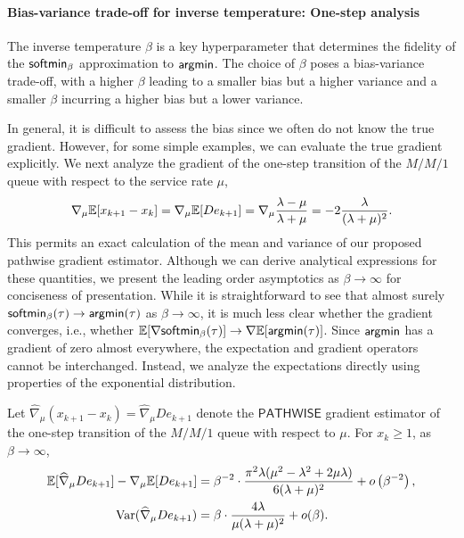 \paragraph{Bias-variance trade-off for inverse temperature: One-step analysis}
The inverse temperature $\beta$ is a key hyperparameter that determines the fidelity of the $\mathsf{softmin}_{\beta}$ approximation to $\mathop{\mathsf{argmin}}$. The choice of $\beta$ poses a bias-variance trade-off, with a higher $\beta$ leading to a smaller bias but a higher variance and a smaller $\beta$ incurring a higher bias but a lower variance. 

In general, it is difficult to assess the bias since we  often do not know the true gradient. However, for some simple examples, we can evaluate the true gradient explicitly. We next analyze the gradient of the one-step transition of the $M/M/1$ queue with respect to the service rate $\mu$,
\[
\nabla_{\mu}\mathbb{E}[x_{k+1} - x_{k}]=  \nabla_{\mu} \mathbb{E}[D e_{k+1}] =\nabla_{\mu}\frac{\lambda - \mu}{\lambda + \mu} = -2\frac{\lambda}{(\lambda + \mu)^{2}}.
\]
This permits an exact calculation of the mean and variance of our proposed pathwise gradient estimator. Although we can derive analytical expressions for these quantities, we present the leading order asymptotics as $\beta \to \infty$ for conciseness of presentation. While it is straightforward to see that almost surely $\mathsf{softmin}_{\beta}(\tau)\to \mathop{\mathsf{argmin}}(\tau)$ as $\beta \to \infty$, it is much less clear whether the gradient converges, i.e., whether $\mathbb{E}[\nabla \mathsf{softmin}_{\beta}(\tau)] \to \nabla \mathbb{E}[\mathop{\mathsf{argmin}}(\tau)]$. Since $\mathop{\mathsf{argmin}}$ has a gradient of zero almost everywhere, the expectation and gradient operators cannot be interchanged. 
Instead, we analyze the expectations directly using properties of the exponential distribution.
\begin{theorem}
\label{thm:mm1-smoothing}
Let $\widehat{\nabla}_\mu (x_{k+1} - x_{k}) =  \widehat{\nabla}_\mu De_{k+1}$ denote the $\mathsf{PATHWISE}$ gradient estimator of the one-step transition of the $M/M/1$ queue with respect to $\mu$.  For $x_k\geq 1$, as $\beta \to \infty$,
\begin{align*}
\mathbb{E}[\widehat{\nabla}_\mu De_{k+1}]
-\nabla_\mu \mathbb{E}[ De_{k+1}]
&= \beta^{-2} \cdot \frac{\pi^{2}\lambda (\mu^{2} - \lambda^{2} + 2\mu \lambda)}{6(\lambda + \mu)^{2}}
+ o \left( \beta^{-2} \right), \\
{\rm Var}(\widehat{\nabla}_\mu De_{k+1})
&= \beta \cdot \frac{4\lambda}{\mu (\lambda + \mu)^{2}} + o(\beta).
\end{align*}
\end{theorem}
